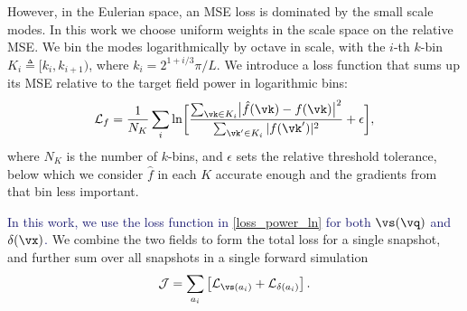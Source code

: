 \documentclass[modern, trackchanges, dvipsnames]{aastex631}
\renewcommand{\d}{d}
\newcommand{\cJ}{\mathcal{J}}
\newcommand{\cL}{\mathcal{L}}
\newcommand{\YZ}[1]{\textcolor{MidnightBlue}{#1}}
\begin{document}
However, in the Eulerian space, an MSE loss is dominated by the small
scale modes.
In this work we choose uniform weights in the scale space on the
relative MSE.
We bin the modes logarithmically by  octave in scale, with
the $i$-th $k$-bin $K_i \triangleq [k_i, k_{i+1})$, where $k_i =
2^{1+i/3} \pi / L$.
We introduce a loss function that sums up its MSE relative to the target
field power in logarithmic bins:
%
\begin{equation}
  \cL_f = \frac1{N_K} \sum_{i} \ln \biggl[
  \frac{\sum_{\vk \in K_i} \bigl| \hat f(\vk) - f(\vk) \bigr|^2}
       {\sum_{\vk' \in K_i} | f(\vk')|^2} + \epsilon \biggr],
\label{loss_power_ln}
\end{equation}
%
where $N_K$ is the number of $k$-bins, and $\epsilon$ sets the relative
threshold tolerance, below which we consider $\hat f$ in each $K$
accurate enough and the gradients from that bin less important.

\YZ{In this work, we use the loss function in \eqref{loss_power_ln} for
both $\vs(\vq)$ and $\delta(\vx)$.}
We combine the two fields to form the total loss for a single snapshot,
and further sum over all snapshots in a single forward simulation
%
\begin{equation}
\cJ = \sum_{a_i} \left[\cL_{\vs(a_i)} + \cL_{\delta(a_i)}\right].
\end{equation}
%


\vspace{1em}
\end{document}
